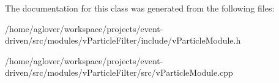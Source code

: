 The documentation for this class was generated from the following files\+:\begin{DoxyCompactItemize}
\item 
/home/aglover/workspace/projects/event-\/driven/src/modules/v\+Particle\+Filter/include/v\+Particle\+Module.\+h\item 
/home/aglover/workspace/projects/event-\/driven/src/modules/v\+Particle\+Filter/src/v\+Particle\+Module.\+cpp\end{DoxyCompactItemize}
